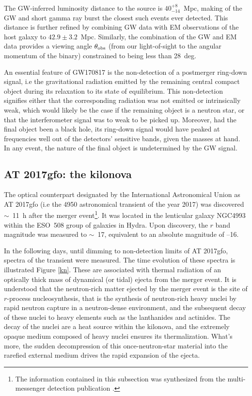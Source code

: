 The GW-inferred luminosity distance to the source is $40_{-14}^{+8}$~Mpc, making of the GW and short gamma ray burst the closest such events ever detected. This distance is further refined by combining GW data with EM observations of the host galaxy to $42.9\pm3.2$~Mpc. Similarly, the combination of the GW and EM data provides a viewing angle $\theta_{\mathrm{obs}}$ (from our light-of-sight to the angular momentum of the binary) constrained to being less than 28~deg.

An essential feature of GW170817 is the non-detection of a postmerger ring-down signal, i.e the gravitational radiation emitted by the remaining central compact object during its relaxation to its state of equilibrium. This non-detection signifies either that the corresponding radiation was not emitted or intrinsically weak, which would likely be the case if the remaining object is a neutron star, or that the interferometer signal was to weak to be picked up. Moreover, had the final object been a black hole, its ring-down signal would have peaked at frequencies well out of the detectors' sensitive bands, given the masses at hand. In any event, the nature of the final object is undetermined by the GW signal.



\subsection{AT 2017gfo: the kilonova}
\label{kilonova}
The optical counterpart designated by the International Astronomical Union as AT 2017gfo (i.e the 4950 astronomical transient of the year 2017) was discovered $\sim$~11~h after the merger event\footnote{The information contained in this subsection was synthesized from the multi-messenger detection publication \citep{51}.}. It was located in the lenticular galaxy NGC4993 within the ESO~508 group of galaxies in Hydra. Upon discovery, the $r$ band magnitude was measured to $\sim$~17, equivalent to an absolute magnitude of --16.

In the following days, until dimming to non-detection limits of AT 2017gfo, spectra of the transient were measured. The time evolution of these spectra is illustrated Figure \ref{kn}. These are associated with thermal radiation of an optically thick mass of dynamical (or tidal) ejecta from the merger event. It is understood that the neutron-rich matter ejected by the merger event is the site of $r$-process nucleosynthesis, that is the synthesis of neutron-rich heavy nuclei by rapid neutron capture in a neutron-dense environment, and the subsequent decay of these nuclei to heavy elements such as the lanthanides and actinides. The decay of the nuclei are a heat source within the kilonova, and the extremely opaque medium composed of heavy nuclei ensures its thermalization. What's more, the sudden decompression of this once-neutron-star material into the rarefied external medium drives the rapid expansion of the ejecta.

